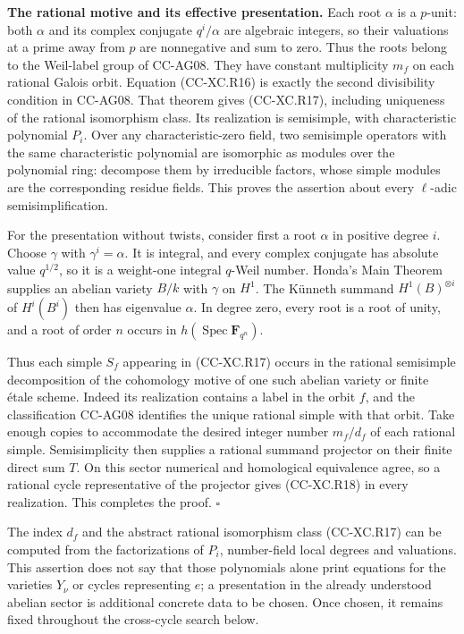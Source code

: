 \textbf{The rational motive and its effective presentation.} Each root
\(\alpha\) is a \(p\)-unit: both \(\alpha\) and its complex conjugate
\(q^i/\alpha\) are algebraic integers, so their valuations at a prime
away from \(p\) are nonnegative and sum to zero. Thus the roots belong
to the Weil-label group of CC-AG08. They have constant multiplicity
\(m_f\) on each rational Galois orbit. Equation (CC-XC.R16) is exactly
the second divisibility condition in CC-AG08. That theorem gives
(CC-XC.R17), including uniqueness of the rational isomorphism class. Its
realization is semisimple, with characteristic polynomial \(P_i\). Over
any characteristic-zero field, two semisimple operators with the same
characteristic polynomial are isomorphic as modules over the polynomial
ring: decompose them by irreducible factors, whose simple modules are
the corresponding residue fields. This proves the assertion about every
\(\ell\)-adic semisimplification.

For the presentation without twists, consider first a root \(\alpha\) in
positive degree \(i\). Choose \(\gamma\) with \(\gamma^i=\alpha\). It is
integral, and every complex conjugate has absolute value \(q^{1/2}\), so
it is a weight-one integral \(q\)-Weil number. Honda's Main Theorem
supplies an abelian variety \(B/k\) with \(\gamma\) on \(H^1\). The
Künneth summand \(H^1(B)^{\otimes i}\) of \(H^i(B^i)\) then has
eigenvalue \(\alpha\). In degree zero, every root is a root of unity,
and a root of order \(n\) occurs in
\(h(\operatorname{Spec}\mathbf F_{q^n})\).

Thus each simple \(S_f\) appearing in (CC-XC.R17) occurs in the rational
semisimple decomposition of the cohomology motive of one such abelian
variety or finite étale scheme. Indeed its realization contains a label
in the orbit \(f\), and the classification CC-AG08 identifies the unique
rational simple with that orbit. Take enough copies to accommodate the
desired integer number \(m_f/d_f\) of each rational simple.
Semisimplicity then supplies a rational summand projector on their
finite direct sum \(T\). On this sector numerical and homological
equivalence agree, so a rational cycle representative of the projector
gives (CC-XC.R18) in every realization. This completes the proof.
\(\square\)

The index \(d_f\) and the abstract rational isomorphism class (CC-XC.R17)
can be computed from the factorizations of \(P_i\), number-field local
degrees and valuations. This assertion does not say that those
polynomials alone print equations for the varieties \(Y_\nu\) or cycles
representing \(e\); a presentation in the already understood abelian
sector is additional concrete data to be chosen. Once chosen, it remains
fixed throughout the cross-cycle search below.

